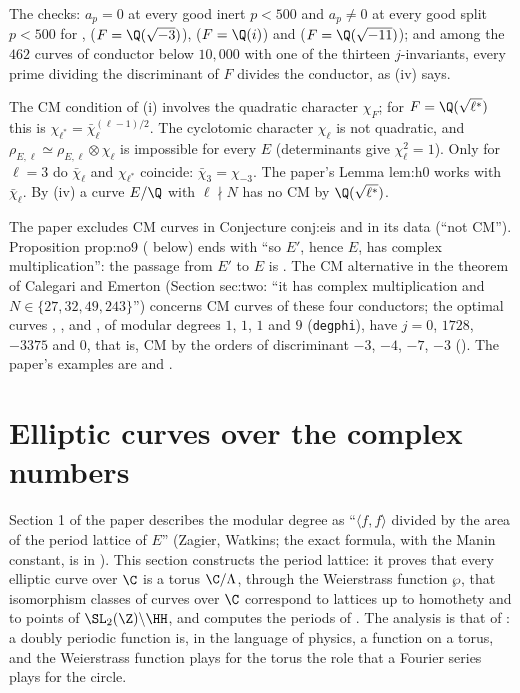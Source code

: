 The checks: $a_p=0$ at every good inert $p<500$ and $a_p\ne0$ at every good split $p<500$ for ,  ($F=\Q(\sqrt{-3})$),  ($F=\Q(i)$)
and  ($F=\Q(\sqrt{-11})$); and among the $462$ curves of conductor below $10{,}000$ with one of the thirteen $j$-invariants, every prime dividing the
discriminant of $F$ divides the conductor, as (iv) says.

\begin{warning}\label{warn:ellcurves:chi-l}
The CM condition of (i) involves the quadratic character $\chi_F$; for $F=\Q(\sqrt{\ell^*})$ this is $\chi_{\ell^*}=\bar\chi_\ell^{(\ell-1)/2}$. The cyclotomic
character $\chi_\ell$ is not quadratic, and $\rho_{E,\ell}\simeq\rho_{E,\ell}\otimes\chi_\ell$ is impossible for every $E$ (determinants give $\chi_\ell^2=1$). Only for $\ell=3$ do $\bar\chi_\ell$
and $\chi_{\ell^*}$ coincide: $\bar\chi_3=\chi_{-3}$. The paper's Lemma lem:h0 works with $\bar\chi_\ell$. By (iv) a curve $E/\Q$ with $\ell\nmid N$ has no CM by $\Q(\sqrt{\ell^*})$.
\end{warning}

\begin{paperlink}\label{pl:ellcurves:cm}
The paper excludes CM curves in Conjecture conj:eis and in its data (``not CM''). Proposition prop:no9 ( below) ends with ``so $E'$, hence
$E$, has complex multiplication'': the passage from $E'$ to $E$ is . The CM alternative in the theorem of Calegari and Emerton (Section sec:two:
``it has complex multiplication and $N\in\{27,32,49,243\}$'') concerns CM curves of these four conductors; the optimal curves , ,
 and , of modular degrees $1$, $1$, $1$ and $9$ (\texttt{degphi}), have $j=0$, $1728$, $-3375$ and $0$, that is, CM by the orders of
discriminant $-3$, $-4$, $-7$, $-3$ (). The paper's examples are  and .
\end{paperlink}
\section{Elliptic curves over the complex numbers}\label{sec:ellcurves:complex}

Section 1 of the paper describes the modular degree as ``$\langle f,f\rangle$ divided by the area of the period lattice of $E$'' (Zagier, Watkins; the exact
formula, with the Manin constant, is in ). This section constructs the period lattice: it proves that every elliptic curve over $\C$ is a torus
$\C/\Lambda$, through the Weierstrass function $\wp$, that isomorphism classes of curves over $\C$ correspond to lattices up to homothety and to points of
$\SL_2(\Z)\backslash\HH$, and computes the periods of . The analysis is that of : a doubly periodic function is, in the language of
physics, a function on a torus, and the Weierstrass function plays for the torus the role that a Fourier series plays for the circle.

